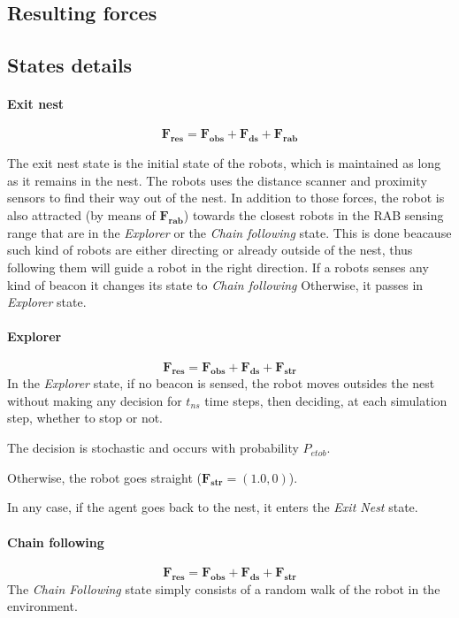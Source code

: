 \subsection{Resulting forces}

\subsection{States details}
\paragraph{Exit nest} \label{par:exitnest}
\begin{equation}
  \mathbf{F_{res}} = \mathbf{F_{obs}} + \mathbf{F_{ds}} + \mathbf{F_{rab}}
\end{equation}

The exit nest state is the initial state of the robots, which is maintained as long as it remains in the nest.
The robots uses the distance scanner and proximity sensors to find their way out 
of the nest.
In addition to those forces, the robot is also attracted (by means of $\mathbf{F_{rab}}$) 
towards the closest robots in the RAB sensing range that are in the \emph{Explorer} 
or the \emph{Chain following} state.
This is done beacause such kind of robots are either directing or already 
outside of the nest, thus following them will guide a robot in the right 
direction.
If a robots senses any kind of beacon it changes its state to \emph{Chain following}
Otherwise, it passes in \emph{Explorer} state.

\paragraph{Explorer}
\begin{equation}
  \mathbf{F_{res}} = \mathbf{F_{obs}} + \mathbf{F_{ds}} + \mathbf{F_{str}}
\end{equation}
In the \emph{Explorer} state, if no beacon is sensed, the robot moves outsides the nest without making any decision for $t_{ns}$ time steps, then deciding, at each simulation step, whether to stop or not.

The decision is stochastic and occurs with probability $P_{etob}$.

Otherwise, the robot goes straight ($\mathbf{F_{str}} = (1.0,0)$).

In any case, if the agent goes back to the nest, it enters the \emph{Exit Nest} state.

\paragraph{Chain following} \label{par:chainfollowing}
\begin{equation}
  \mathbf{F_{res}} = \mathbf{F_{obs}} + \mathbf{F_{ds}} + \mathbf{F_{str}}
\end{equation}
The \emph{Chain Following} state simply consists of a random walk of the robot 
in the environment.

